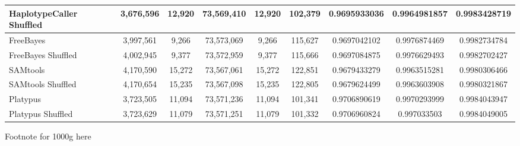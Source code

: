 \begin{table}[htb]
\begin{center}
\begin{tabular}{|l||c|c|c|c|c|c|c|c|}
\hline
HaplotypeCaller Shuffled & 3,676,596 & 12,920 & 73,569,410 & 12,920 & 102,379 & 0.9695933036 & 0.9964981857 & 0.9983428719 \\
\hline
FreeBayes & 3,997,561 & 9,266 & 73,573,069 & 9,266 & 115,627 & 0.9697042102 & 0.9976874469 & 0.9982734784 \\
\hline
FreeBayes Shuffled & 4,002,945 & 9,377 & 73,572,959 & 9,377 & 115,666 & 0.9697084875 & 0.9976629493 & 0.9982702427 \\
\hline
SAMtools & 4,170,590 & 15,272 & 73,567,061 & 15,272 & 122,851 & 0.9679433279 & 0.9963515281 & 0.9980306466 \\
\hline
SAMtools Shuffled & 4,170,654 & 15,235 & 73,567,098 & 15,235 & 122,805 & 0.9679624499 & 0.9963603908 & 0.9980321867 \\
\hline
Platypus & 3,723,505 & 11,094 & 73,571,236 & 11,094 & 101,341 & 0.9706890619 & 0.9970293999 & 0.9984043947 \\
\hline
Platypus Shuffled & 3,723,629 & 11,079 & 73,571,251 & 11,079 & 101,332 & 0.9706960824 & 0.997033503 & 0.9984049005 \\
\hline
\end{tabular}
\end{center}
{\footnotesize Footnote for 1000g here}
\label{supptab:orig-vs-shuf-hc}
\end{table}


